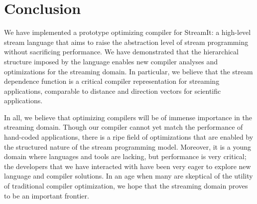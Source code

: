 \section{Conclusion}

We have implemented a prototype optimizing compiler for StreamIt: a
high-level stream language that aims to raise the abstraction level of
stream programming without sacrificing performance.  We have
demonstrated that the hierarchical structure imposed by the language
enables new compiler analyses and optimizations for the streaming
domain.  In particular, we believe that the stream dependence function
is a critical compiler representation for streaming applications,
comparable to distance and direction vectors for scientific
applications.

In all, we believe that optimizing compilers will be of immense
importance in the streaming domain.  Though our compiler cannot yet
match the performance of hand-coded applications, there is a ripe
field of optimizations that are enabled by the structured nature of
the stream programming model.  Moreover, it is a young domain where
languages and tools are lacking, but performance is very critical; the
developers that we have interacted with have been very eager to
explore new language and compiler solutions.  In an age when many are
skeptical of the utility of traditional compiler optimization, we hope
that the streaming domain proves to be an important frontier.


